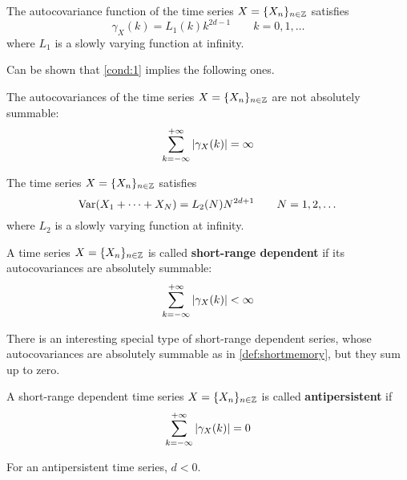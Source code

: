 \begin{condition}\label{cond:1}
	The autocovariance function of the time series $X = \{ X_n \}_{n \in \mathbb{Z}}$ satisfies
	\begin{equation}
		\gamma_X(k) = L_1(k) k^{2d -1} \qquad k=0,1,\dots
	\end{equation}
	where $L_1$ is a slowly varying function at infinity.
\end{condition}

Can be shown that \autoref{cond:1} implies the following ones.\\ 
\begin{condition}\label{cond:2}
	The autocovariances of the time series $X = \{ X_n \}_{n \in \mathbb{Z}}$ are not absolutely summable:
	\begin{equation}
		\sum_{k=-\infty}^{+\infty} \abs{\gamma_X(k)} = \infty
	\end{equation}
\end{condition}

\begin{condition}\label{cond:3}
	The time series $X = \{ X_n \}_{n \in \mathbb{Z}}$ satisfies
	\begin{equation}
		\textnormal{Var}(X_1 + \dots + X_N) = L_2(N) N^{2d + 1} \qquad N = 1, 2, \dots
	\end{equation}
	where $L_2$ is a slowly varying function at infinity.
\end{condition}

\begin{definition}\label{def:shortmemory}
	A time series $X = \{ X_n \}_{n \in \mathbb{Z}}$ is called \textbf{short-range dependent} if its autocovariances are absolutely summable:
	\begin{equation}
		\sum_{k=-\infty}^{+\infty} \abs{\gamma_X(k)} < \infty
	\end{equation}
\end{definition}

There is an interesting special type of short-range dependent series, whose autocovariances are absolutely summable as in \autoref{def:shortmemory}, but they sum up to zero.
\begin{definition}
	A short-range dependent time series $X = \{ X_n \}_{n \in \mathbb{Z}}$ is called \textbf{antipersistent} if
	\begin{equation}
		\sum_{k=-\infty}^{+\infty} \abs{\gamma_X(k)} = 0
	\end{equation}
\end{definition}

For an antipersistent time series, $d < 0$.

